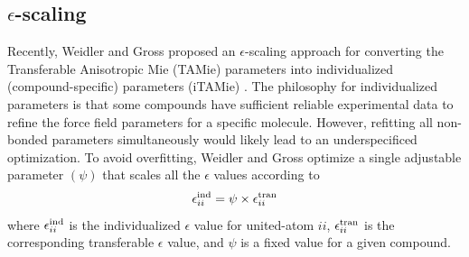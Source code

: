 \documentclass[journal=jced,manuscript=article]{achemso}
\begin{document}
%
%
%



\subsection{$\epsilon$-scaling} \label{sec: eps scaling methods}

Recently, Weidler and Gross proposed an $\epsilon$-scaling approach for converting the Transferable Anisotropic Mie (TAMie) parameters into individualized (compound-specific) parameters (iTAMie) \cite{Weidler2018}. The philosophy for individualized parameters is that some compounds have sufficient reliable experimental data to refine the force field parameters for a specific molecule. However, refitting all non-bonded parameters simultaneously would likely lead to an underspecificed optimization. To avoid overfitting, Weidler and Gross optimize a single adjustable parameter $(\psi)$ that scales all the $\epsilon$ values according to
\begin{equation}
\epsilon_{ii}^{\rm ind} = \psi \times \epsilon_{ii}^{\rm tran}
\end{equation}
where $\epsilon_{ii}^{\rm ind}$ is the individualized $\epsilon$ value for united-atom $ii$, $\epsilon_{ii}^{\rm tran}$ is the corresponding transferable $\epsilon$ value, and $\psi$ is a fixed value for a given compound.
\end{document}
